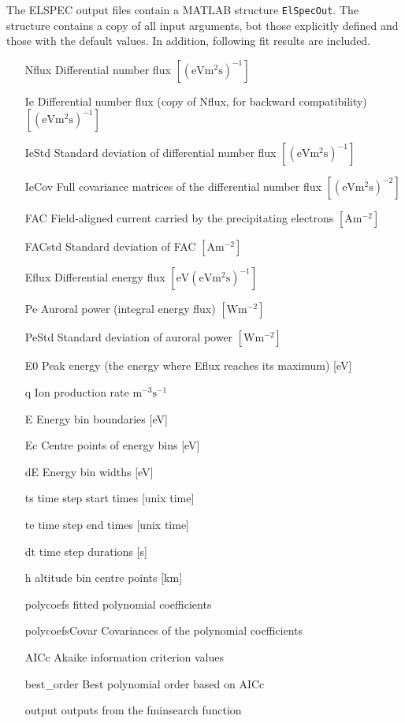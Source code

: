 \documentclass[12pt,a4paper]{report}
\begin{document}
The ELSPEC output files contain a MATLAB structure \verb|ElSpecOut|. The structure contains a copy of all input arguments, bot those explicitly defined and those with the default values. In addition, following fit results are included.

\begin{itemize}
\item[Nflux] Differential number flux $\mathrm{[(eVm^2s)^{-1}]}$
\item[Ie] Differential number flux (copy of Nflux, for backward compatibility) $\mathrm{[(eVm^2s)^{-1}]}$
\item[IeStd] Standard deviation of differential number flux $\mathrm{[(eVm^2s)^{-1}]}$
\item[IeCov] Full covariance matrices of the differential number flux $\mathrm{[(eVm^2s)^{-2}]}$
\item[FAC] Field-aligned current carried by the precipitating electrons $\mathrm{[Am^{-2}]}$
\item[FACstd] Standard deviation of FAC $\mathrm{[Am^{-2}]}$
\item[Eflux] Differential energy flux $\mathrm{[eV(eVm^2s)^{-1}]}$
\item[Pe] Auroral power (integral energy flux) $\mathrm{[Wm^{-2}]}$
\item[PeStd] Standard deviation of auroral power $\mathrm{[Wm^{-2}]}$
\item[E0] Peak energy (the energy where Eflux reaches its maximum) [eV]
\item[q] Ion production rate $\mathrm{m^{-3}s^{-1}}$
\item[E] Energy bin boundaries [eV]
\item[Ec] Centre points of energy bins [eV]
\item[dE] Energy bin widths [eV]
\item[ts] time step start times [unix time]
\item[te] time step end times [unix time]
\item[dt] time step durations [s]
\item[h] altitude bin centre points [km]
\item[polycoefs] fitted polynomial coefficients
\item[polycoefsCovar] Covariances of the polynomial coefficients
\item[AICc] Akaike information criterion values
\item[best\_order] Best polynomial order based on AICc
\item[output] outputs from the fminsearch function

\end{itemize}
\end{document}
